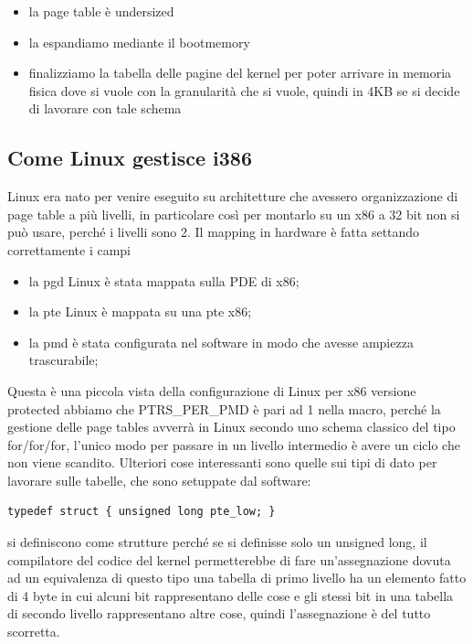 \documentclass[12pt, oneside]{extbook}
\begin{document}
\begin{itemize}
\item la page table è undersized
\item la espandiamo mediante il bootmemory
\item finalizziamo la tabella delle pagine del kernel per poter arrivare in memoria fisica dove si vuole con la granularità che si vuole, quindi in 4KB se si decide di lavorare con tale schema
\end{itemize}
\subsection{Come Linux gestisce i386}
Linux era nato per venire eseguito su architetture che avessero organizzazione di page table a più livelli, in particolare così
per montarlo su un x86 a 32 bit non si può usare, perché i livelli sono 2. Il mapping in hardware è fatta settando correttamente i campi
\begin{itemize}
\item la pgd Linux è stata mappata sulla PDE di x86;
\item la pte Linux è mappata su una pte x86;
\item la pmd è stata configurata nel software in modo che avesse ampiezza trascurabile;
\end{itemize}
Questa è una piccola vista della configurazione di Linux per x86 versione protected
abbiamo che \textsf{PTRS\_PER\_PMD} è pari ad 1 nella macro, perché la gestione delle page tables avverrà in Linux secondo uno schema classico del tipo for/for/for, l'unico modo per passare in un livello intermedio è avere un ciclo che non viene scandito. Ulteriori cose interessanti sono quelle sui tipi di dato per lavorare sulle tabelle, che sono setuppate dal software:
\begin{lstlisting}
typedef struct { unsigned long pte_low; }
\end{lstlisting}
si definiscono come strutture perché se si definisse solo un unsigned long, il compilatore del codice del kernel permetterebbe di fare un'assegnazione dovuta ad un equivalenza di questo tipo
una tabella di primo livello ha un elemento fatto di 4 byte in cui alcuni bit rappresentano delle cose e gli stessi bit in una tabella di secondo livello rappresentano altre cose, quindi l'assegnazione è del tutto scorretta.
\end{document}
